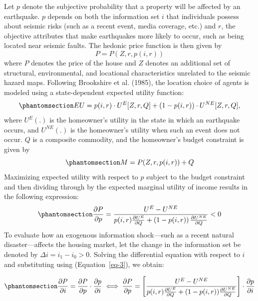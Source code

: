 \documentclass[
  letterpaper,
  DIV=11,
  numbers=noendperiod]{scrartcl}
\begin{document}
Let \(p\) denote the subjective probability that a property will be
affected by an earthquake. \(p\) depends on both the information set
\(i\) that individuals possess about seismic risks (such as a recent
event, media coverage, etc.) and \(r\), the objective attributes that
make earthquakes more likely to occur, such as being located near
seismic faults. The hedonic price function is then given by
\[P = P(Z, r, p(i,r))\] where \(P\) denotes the price of the house and
\(Z\) denotes an additional set of structural, environmental, and
locational characteristics unrelated to the seismic hazard maps.
Following Brookshire et al. (1985), the location choice of agents is
modeled using a state-dependent expected utility function:
\begin{equation}\phantomsection\label{eq-1}{
EU = p(i, r) \cdot U^E[Z, r, Q] + (1 - p(i, r)) \cdot U^{NE}[Z, r, Q],
}\end{equation} where \(U^E(.)\) is the homeowner's utility in the state
in which an earthquake occurs, and \(U^{NE}(.)\) is the homeowner's
utility when such an event does not occur. \(Q\) is a composite
commodity, and the homeowner's budget constraint is given by
\begin{equation}\phantomsection\label{eq-2}{M = P(Z, r, p(i, r)) + Q}\end{equation}
Maximizing expected utility with respect to \(p\) subject to the budget
constraint and then dividing through by the expected marginal utility of
income results in the following expression:
\begin{equation}\phantomsection\label{eq-3}{
\frac{\partial P}{\partial p}
=
\frac{U^{E} - U^{NE}}
{
p(i,r)\frac{\partial U^{E}}{\partial Q}
+
\left(1 - p(i,r)\right)\frac{\partial U^{NE}}{\partial Q}
} < 0
}\end{equation} To evaluate how an exogenous information shock---such as
a recent natural disaster---affects the housing market, let the change
in the information set be denoted by \(\Delta i = i_1 - i_0 > 0\).
Solving the differential equation with respect to \(i\) and substituting
using (Equation~\ref{eq-3}), we obtain:

\begin{equation}\phantomsection\label{eq-4}{\frac{\partial P}{\partial i} = \frac{\partial P}{\partial p} \cdot \frac{\partial p}{\partial i} \iff \frac{\partial P}{\partial p} = \left[ \frac{U^E - U^{NE}}{p(i, r)\frac{\partial U^E}{\partial Q} + (1 - p(i, r))\frac{\partial U^{NE}}{\partial Q}} \right] \cdot \frac{\partial p}{\partial i} }\end{equation}
\end{document}
